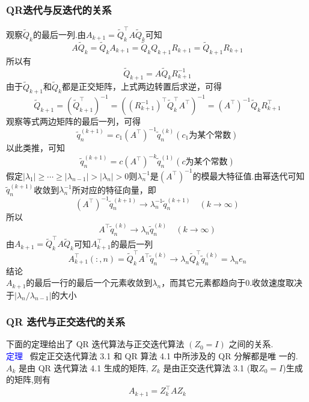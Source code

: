 \documentclass[12pt,a4paper]{article}
\begin{document}
\subsubsection{QR迭代与反迭代的关系}
观察$\tilde{Q}_{k}$的最后一列.由$A_{k+1}=\tilde{Q}_{k}^{\top} A \tilde{Q}_{k}$可知
$$
A \tilde{Q}_{k}=\tilde{Q}_{k} A_{k+1}=\tilde{Q}_{k} Q_{k+1} R_{k+1}=\tilde{Q}_{k+1} R_{k+1}
$$
所以有
$$
\tilde{Q}_{k+1}=A \tilde{Q}_{k} R_{k+1}^{-1}
$$
由于$\tilde{Q}_{k+1}$和$\tilde{Q}_{k}$都是正交矩阵，上式两边转置后求逆，可得
$$
\tilde{Q}_{k+1}=\left(\tilde{Q}_{k+1}^{\top}\right)^{-1}=\left(\left(R_{k+1}^{-1}\right)^{\top} \tilde{Q}_{k}^{\top} A^{\top}\right)^{-1}=\left(A^{\top}\right)^{-1} \tilde{Q}_{k} R_{k+1}^{\top}
$$
观察等式两边矩阵的最后一列，可得
$$
\tilde{q}_{n}^{(k+1)}=c_{1}\left(A^{\top}\right)^{-1} \tilde{q}_{n}^{(k)}(c_{1}\text{为某个常数})
$$
以此类推，可知
$$
\tilde{q}_{n}^{(k+1)}=c\left(A^{\top}\right)^{-k} \tilde{q}_{n}^{(1)}(c\text{为某个常数})
$$
假定$\left|\lambda_{1}\right| \geq \cdots \geq\left|\lambda_{n-1}\right|>\left|\lambda_{n}\right|>0$则$\lambda_{n}^{-1}$是$\left(A^{\top}\right)^{-1}$的模最大特征值.由幂迭代可知$\tilde{q}_{n}^{(k+1)}$收敛到$\lambda_{n}^{-1}$所对应的特征向量，即
$$
\left(A^{\top}\right)^{-1} \tilde{q}_{n}^{(k+1)} \rightarrow \lambda_{n}^{-1} \tilde{q}_{n}^{(k+1)} \quad(k \rightarrow \infty)
$$
所以
$$
A^{\top} \tilde{q}_{n}^{(k)} \rightarrow \lambda_{n} \tilde{q}_{n}^{(k)} \quad(k \rightarrow \infty)
$$
由$A_{k+1}=\tilde{Q}_{k}^{\top} A \tilde{Q}_{k}$可知$A_{k+1}^{\top}$的最后一列
$$
A_{k+1}^{\top}( :, n)=\tilde{Q}_{k}^{\top} A^{\top} \tilde{q}_{n}^{(k)} \rightarrow \lambda_{n} \tilde{Q}_{k}^{\top} \tilde{q}_{n}^{(k)}=\lambda_{n} e_{n}
$$
$\mathbf{结论}$\\
$A_{k+1}$的最后一行的最后一个元素收敛到$\lambda_{n}$，而其它元素都趋向于0.收敛速度取决于$\left|\lambda_{n} / \lambda_{n-1}\right|$的大小
\subsubsection{QR 迭代与正交迭代的关系}
下面的定理给出了 QR 迭代算法与正交迭代算法 $(Z_{0} = I)$ 之间的关系.\\
\textcolor{blue}{定理} ~假定正交迭代算法 3.1 和 QR 算法 4.1 中所涉及的 QR 分解都是唯 一的. $A_{k}$ 是由 QR 迭代算法 4.1 生成的矩阵, $Z_{k}$ 是由正交迭代算法 3.1 (取$Z_{0} =I$)生成的矩阵,则有
$$
A_{k+1}=Z_{k}^{\top} A Z_{k}
$$
\end{document}
